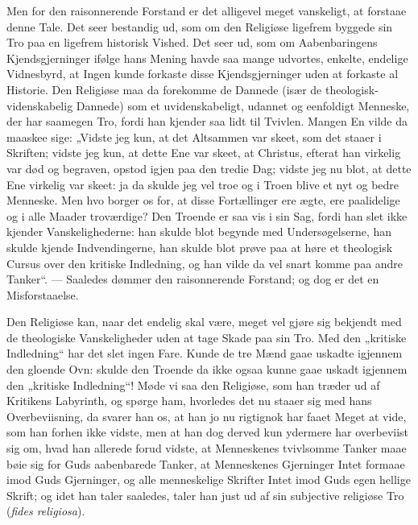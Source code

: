 \documentclass[12pt,a4paper]{book}
\newcommand{\opage}[1]{\marginnote{\footnotesize\textit{[#1]}}}
\begin{document}
Men for den raisonnerende Forstand er det alligevel meget vanskeligt, at
forstaae denne Tale. Det seer bestandig ud, som om den Religiøse ligefrem
byggede sin Tro paa en ligefrem historisk Vished. Det seer ud, som om
Aabenbaringens Kjendsgjerninger ifølge hans Mening havde saa mange udvortes,
enkelte, endelige Vidnesbyrd, at Ingen kunde forkaste disse Kjendsgjerninger
uden at forkaste al Historie. Den Religiøse maa da forekomme de Dannede (især
de theologisk-videnskabelig Dannede) som et uvidenskabeligt, udannet og
eenfoldigt Menneske, der har saamegen Tro, fordi han kjender saa lidt til
Tvivlen. Mangen En vilde da maaskee sige: „Vidste jeg kun, at det Altsammen var
skeet, som det staaer i Skriften; vidste jeg kun, at dette Ene var skeet, at
Christus, efterat han virkelig var død og begraven, opstod igjen paa den tredie
Dag; vidste jeg nu blot, at dette Ene virkelig var skeet: ja da skulde jeg vel
troe og i Troen blive et nyt og bedre Menneske. Men hvo borger os for, at disse
Fortællinger ere ægte, ere paalidelige og i alle Maader troværdige? Den Troende
er saa vis i sin Sag, fordi han slet ikke kjender Vanskelighederne: han skulde
blot begynde med Undersøgelserne, han skulde kjende Indvendingerne, han skulde
blot prøve
\opage{16} paa at høre et theologisk Cursus over den kritiske Indledning, og han vilde da
vel snart komme paa andre Tanker“. --- Saaledes dømmer den raisonnerende
Forstand; og dog er det en Misforstaaelse.

Den Religiøse kan, naar det endelig skal være, meget vel gjøre sig bekjendt med
de theologiske Vanskeligheder uden at tage Skade paa sin Tro. Med den „kritiske
Indledning“ har det slet ingen Fare. Kunde de tre Mænd gaae uskadte igjennem den
gloende Ovn: skulde den Troende da ikke ogsaa kunne gaae uskadt igjennem den
„kritiske Indledning“! Møde vi saa den Religiøse, som han træder ud af
Kritikens Labyrinth, og spørge ham, hvorledes det nu staaer sig med hans
Overbeviisning, da svarer han os, at han jo nu rigtignok har faaet Meget at
vide, som han forhen ikke vidste, men at han dog derved kun ydermere har
overbeviist sig om, hvad han allerede forud vidste, at Menneskenes tvivlsomme
Tanker maae bøie sig for Guds aabenbarede Tanker, at Menneskenes Gjerninger
Intet formaae imod Guds Gjerninger, og alle menneskelige Skrifter Intet imod
Guds egen hellige Skrift; og idet han taler saaledes, taler han just ud af sin
subjective religiøse Tro (\textit{fides religiosa}).
\end{document}
